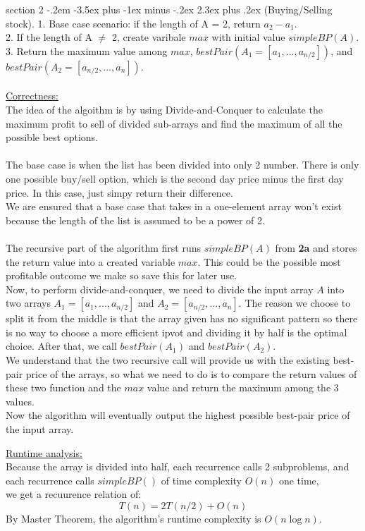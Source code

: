 \documentclass{article}
\makeatletter
\newenvironment{problem}{\@startsection
       {section}
       {2}
       {-.2em}
       {-3.5ex plus -1ex minus -.2ex}
       {2.3ex plus .2ex}
       {\pagebreak[3]%
       \large\bf\noindent{Problem }
       }
       }
\makeatother
\begin{document}
\begin{problem}{(Buying/Selling stock).}
1. Base case scenario: if the length of A = 2, return \(a_2 - a_1\).\\
2. If the length of A \(\neq\) 2, create varibale \(max\) with initial value \(simpleBP(A)\).\\
3. Return the maximum value among \(max\), \(bestPair(A_1 = [a_1,...,a_{n/2}])\), and \(bestPair(A_2 = [a_{n/2},...,a_n])\).
\\ \hspace*{\fill} \\
\underline{Correctness:}\\
The idea of the algoithm is by using Divide-and-Conquer to calculate the maximum profit to sell of divided sub-arrays and find the maximum of all the possible best options.
\\ \hspace*{\fill} \\
The base case is when the list has been divided into only 2 number. There is only one possible buy/sell option, which is the second day price minus the first day price. In this case, just simpy return their difference.\\
We are ensured that a base case that takes in a one-element array won't exist because the length of the list is assumed to be a power of 2.
\\ \hspace*{\fill} \\
The recursive part of the algorithm first runs \(simpleBP(A)\) from \textbf{2a} and stores the return value into a created variable \(max\). This could be the possible most profitable outcome we make so save this for later use.\\
Now, to perform divide-and-conquer, we need to divide the input array \(A\) into two arrays \(A_1 = [a_1,...,a_{n/2}]\) and \(A_2 = [a_{n/2},...,a_n]\). The reason we choose to split it from the middle is that the array given has no significant pattern so there is no way to choose a more efficient ipvot and dividing it by half is the optimal choice. After that, we call \(bestPair(A_1)\) and \(bestPair(A_2)\).\\
We understand that the two recursive call will provide us with the existing best-pair price of the arrays, so what we need to do is to compare the return values of these two function and the \(max\) value and return the maximum among the 3 values.\\
Now the algorithm will eventually output the highest possible best-pair price of the input array. \newpage 

\noindent \underline{Runtime analysis:}\\
 Because the array is divided into half, each recurrence calls 2 subproblems, and each recurrence calls \(simpleBP()\) of time complexity \(O(n)\) one time,\\
we get a recuurence relation of:
\[T(n) = 2T(n/2) + O(n)\]
By Master Theorem, the algorithm's runtime complexity is \(O(n\log n)\).

\end{problem}
\end{document}
